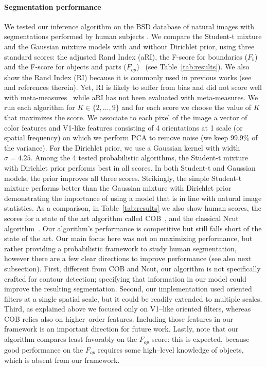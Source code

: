 \documentclass[a4paper,12pt]{article}
\begin{document}
\paragraph{Segmentation performance}
We tested our inference algorithm on the BSD database of natural images with segmentations performed by human subjects \cite{MartinFTM01,arbelaez2011contour}. We compare the Student-t mixture and the Gaussian mixture models with and without Dirichlet prior, using three standard scores: the adjusted Rand Index (aRI), the F-score for boundaries ($F_b$) and the F-score for objects and parts ($F_{op}$)~\cite{pont2013measures} (see Table~\ref{tab:results}). We also show the Rand Index (RI) because it is commonly used in previous works (see~\cite{pont2013measures} and references therein). Yet, RI is likely to suffer from bias and did not score well with meta-measures~\cite{pont2013measures} while aRI has not been evaluated with meta-measures. We run each algorithm for $K \in \{2,\dots,9\}$ and for each score we choose the value of $K$ that maximizes the score. We associate to each pixel of the image a vector of color features and V1-like features consisting of 4 orientations at 1 scale (or spatial frequency) on which we perform PCA to remove noise (\ie we keep $99.9\%$ of the variance). For the Dirichlet prior, we use a Gaussian kernel with width $\sigma=4.25$. Among the 4 tested probabilistic algorithms, the Student-t mixture with Dirichlet prior performs best in all scores. In both Student-t and Gaussian models, the prior improves all three scores. Strikingly, the simple Student-t mixture performs better than the Gaussian mixture with Dirichlet prior demonstrating the importance of using a model that is in line with natural image statistics. As a comparison, in Table~\ref{tab:results} we also show human scores, the scores for a state of the art algorithm called COB~\cite{maninis2016convolutional}, and the classical Ncut algorithm~\cite{maninis2016convolutional}. Our algorithm's performance is competitive but still falls short of the state of the art. Our main focus here was not on maximizing performance, but rather providing a probabilistic framework to study human segmentation, however there are a few clear directions to improve performance (see also next subsection). First, different from COB and Ncut, our algorithm is not specifically crafted for contour detection; specifying that information in our model could improve the resulting segmentation. Second, our implementation used oriented filters at a single spatial scale, but it could be readily extended to multiple scales. Third, as explained above we focused only on V1--like oriented filters, whereas COB relies also on higher--order features. Including those features in our framework is an important direction for future work. Lastly, note that our algorithm compares least favorably on the $F_{op}$ score: this is expected, because good performance on the $F_{op}$ requires some high--level knowledge of objects, which is absent from our framework. 
\end{document}

